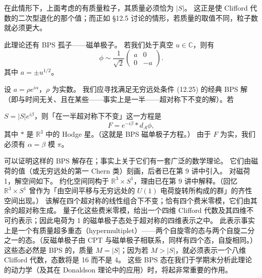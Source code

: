 在此情形下，上面考虑的有质量粒子，其质量必须恰为 $|S|$。
这正是使 Clifford 代数的二次型退化的那个值；而正如 §12.5 讨论的情形，若质量的取值不同，粒子数就必须更大。

此理论还有 BPS 孤子——磁单极子。
若我们处于真空 $u\in\mathbb{C}$，则有
\begin{equation}
  \tag{12.25}
  \label{eq:12-25}
  \phi\sim\frac{1}{\sqrt2}\begin{pmatrix}a&0\\0&-a\end{pmatrix}.
\end{equation}
其中 $a=\pm u^{1/2}$。


设 $a=\rho e^{i\alpha}$，$\rho$ 为实数。
我们应寻找满足无穷远处条件 (12.25) 的经典 BPS 解（即与时间无关、且在某些——事实上是一半——超对称下不变的解）。若

$S=|S|e^{i\beta}$，则「在一半超对称下不变」这一方程是
\begin{equation}
  \tag{12.26}
  \label{eq:12-26}
  F=e^{-i\beta}*d_A\phi,
\end{equation}
其中 $*$ 是 $\mathbb{R}^3$ 中的 Hodge 星。（这就是 BPS 磁单极子方程。）
由于 $F$ 为实，我们必须有 $\alpha=\beta$ 模 $\pi$。

可以证明这样的 BPS 解存在；事实上关于它们有一套广泛的数学理论。
它们由磁荷的值（或无穷远处的第一 Chern 类）刻画，后者已在第 9 讲中引入。
对磁荷 1，解空间如下。
约化空间同构于 $\mathbb{R}^3\times S^1$，理由已在第 9 讲中解释。（回忆 $\mathbb{R}^3\times S^1$ 曾作为「由空间平移与无穷远处的 $U(1)$ 电荷旋转所构成的群」的齐性空间出现。）
该解在四个超对称的线性组合下不变；恰有四个费米零模，它们由其余的超对称生成。
量子化这些费米零模，给出一个四维 Clifford 代数及其四维不可约表示；因此电荷为 1 的磁单极子态处于超对称的四维表示之中。
此表示事实上是一个有质量超多重态（hypermultiplet）——两个自旋零的态与两个自旋二分之一的态。（反磁单极子由 CPT 与磁单极子相联系，同样有四个态，自旋相同。）
这些态必然是 BPS 的，质量 $M=|S|$；因为若 $M>|S|$，就必须表示一个八维 Clifford 代数，态数将是 16 而不是 4。
这些 BPS 态在我们于学期末分析此理论的动力学（及其在 Donaldson 理论中的应用）时，将起非常重要的作用。

